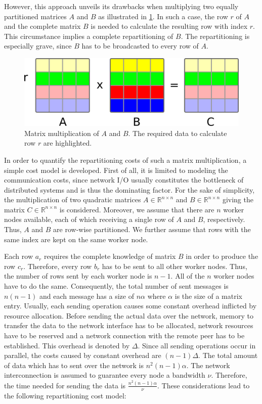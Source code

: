 However, this approach unveils its drawbacks when multiplying two equally partitioned matrices $A$ and $B$ as illustrated in \cref{fig:rowPartitioningMM}.
In such a case, the row $r$ of $A$ and the complete matrix $B$ is needed to calculate the resulting row with index $r$.
This circumstance implies a complete repartitioning of $B$.
The repartitioning is especially grave, since $B$ has to be broadcasted to every row of $A$.

\begin{figure}[!h]
	\centering
	\includegraphics[width=0.6\linewidth]{images/rowMM.png}
	\caption{Matrix multiplication of $A$ and $B$. The required data to calculate row $r$ are highlighted.}
	\label{fig:rowPartitioningMM}
\end{figure}

In order to quantify the repartitioning costs of such a matrix multiplication, a simple cost model is developed.
First of all, it is limited to modeling the communication costs, since network I/O usually constitutes the bottleneck of distributed systems and is thus the dominating factor.
For the sake of simplicity, the multiplication of two quadratic matrices $A \in \mathbb{R}^{n\times n}$ and $B \in \mathbb{R}^{n\times n}$ giving the matrix $C\in \mathbb{R}^{n \times n}$ is considered.
Moreover, we assume that there are $n$ worker nodes available, each of which receiving a single row of $A$ and $B$, respectively.
Thus, $A$ and $B$ are row-wise partitioned.
We further assume that rows with the same index are kept on the same worker node.

Each row $a_r$ requires the complete knowledge of matrix $B$ in order to produce the row $c_r$.
Therefore, every row $b_r$ has to be sent to all other worker nodes.
Thus, the number of rows sent by each worker node is $n-1$.
All of the $n$ worker nodes have to do the same.
Consequently, the total number of sent messages is $n(n-1)$ and each message has a size of $n\alpha$ where $\alpha$ is the size of a matrix entry.
Usually, each sending operation causes some constant overhead inflicted by resource allocation.
Before sending the actual data over the network, memory to transfer the data to the network interface has to be allocated, network resources have to be reserved and a network connection with the remote peer has to be established.
This overhead is denoted by $\Delta$.
Since all sending operations occur in parallel, the costs caused by constant overhead are $(n-1)\Delta$.
The total amount of data which has to sent over the network is $n^2(n-1)\alpha$.
The network interconnection is assumed to guarantee every node a bandwidth $\nu$.
Therefore, the time needed for sending the data is $\frac{n^2(n-1)\alpha}{\nu}$.
These considerations lead to the following repartitioning cost model:

